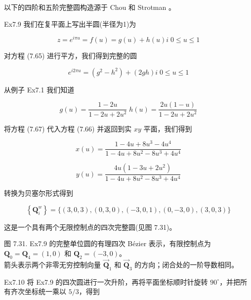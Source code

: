 \documentclass[../main.tex]{subfiles}
\begin{document}
以下的四阶和五阶完整圆构造源于 Chou \cite{Chou95} 和 Strotman \cite{Stro91}。

Ex7.9 我们在复平面上写出半圆(半径为1)为

\[
z = {e}^{i\pi u} = f\left( u\right)  = g\left( u\right)  + h\left( u\right) i\;0 \leq  u \leq  1 \tag{7.65}
\]

对方程 (7.65) 进行平方，我们得到完整的圆

\[
{e}^{i2\pi u} = \left( {{g}^{2} - {h}^{2}}\right)  + \left( {2gh}\right) i\;0 \leq  u \leq  1 \tag{7.66}
\]

从例子 Ex7.1 我们知道

\[
g\left( u\right)  = \frac{1 - {2u}}{1 - {2u} + 2{u}^{2}}\;h\left( u\right)  = \frac{{2u}\left( {1 - u}\right) }{1 - {2u} + 2{u}^{2}} \tag{7.67}
\]

将方程 (7.67) 代入方程 (7.66) 并返回到实 \({xy}\) 平面，我们得到

\[
x\left( u\right)  = \frac{1 - {4u} + 8{u}^{3} - 4{u}^{4}}{1 - {4u} + 8{u}^{2} - 8{u}^{3} + 4{u}^{4}}
\]

\[
y\left( u\right)  = \frac{{4u}\left( {1 - {3u} + 2{u}^{2}}\right) }{1 - {4u} + 8{u}^{2} - 8{u}^{3} + 4{u}^{4}} \tag{7.68}
\]









转换为贝塞尔形式得到

\[
\left\{  {\mathbf{Q}}_{i}^{w}\right\}   = \{ \left( {3,0,3}\right) ,\left( {0,3,0}\right) ,\left( {-3,0,1}\right) ,\left( {0, - 3,0}\right) ,\left( {3,0,3}\right) \}
\]

这是一个具有两个无限控制点的四次完整圆(见图 7.31)。

\begin{center}
\begin{minipage}{27cm}
\vspace*{.6\baselineskip}
\centering
{}
\par\smallskip
图 7.31. Ex7.9 的完整单位圆的有理四次 Bézier 表示，有限控制点为 $\mathbf Q_0=\mathbf Q_4=(1,0)$ 和 $\mathbf Q_2=(-3,0)$。\\
箭头表示两个非零无穷控制向量 $\overrightarrow{\mathbf Q}_1$ 和 $\overrightarrow{\mathbf Q}_3$ 的方向；闭合处的一阶导数相同。
\end{minipage}
\end{center}

Ex7.10 将 Ex7.9 的四次圆进行一次升阶，再将平面坐标顺时针旋转 $90^\circ$，并把所有齐次坐标统一乘以 $5/3$，得到
\end{document}

